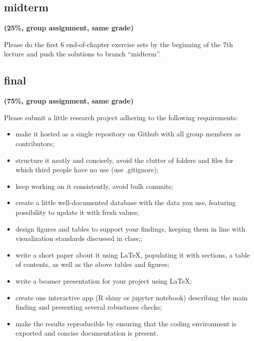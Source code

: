 \documentclass[12pt]{article}
\begin{document}
\subsection{midterm} %

\textbf{(25\%, group assignment, same grade)}

Please do the first 6 end-of-chapter exercise sets by the beginning of the 7th lecture and push the solutions to branch ``midterm''.

\label{sub:midterm}


\subsection{final} %
\label{sub:final}

\textbf{(75\%, group assignment, same grade)}

Please submit a little research project adhering to the following requirements:

\begin{itemize}[topsep=0pt, itemsep=4pt, partopsep=0pt, parsep=0pt]
    \item make it hosted as a single repository on Github with all group members as contributors;
    \item structure it neatly and concisely, avoid the clutter of folders and files for which third people have no use (use .gitignore);
    \item keep working on it consistently, avoid bulk commits;
    \item create a little well-documented database with the data you use, featuring possibility to update it with fresh values;
    \item design figures and tables to support your findings, keeping them in line with visualization standards discussed in class;;
    \item write a short paper about it using LaTeX, populating it with sections, a table of contents, as well as the above tables and figures;
    \item write a beamer presentation for your project using LaTeX;
    \item create one interactive app (R shiny or jupyter notebook) describing the main finding and presenting several robustness checks;
    \item make the results reproducible by ensuring that the coding environment is exported and concise documentation is present.
\end{itemize}


\end{document}
